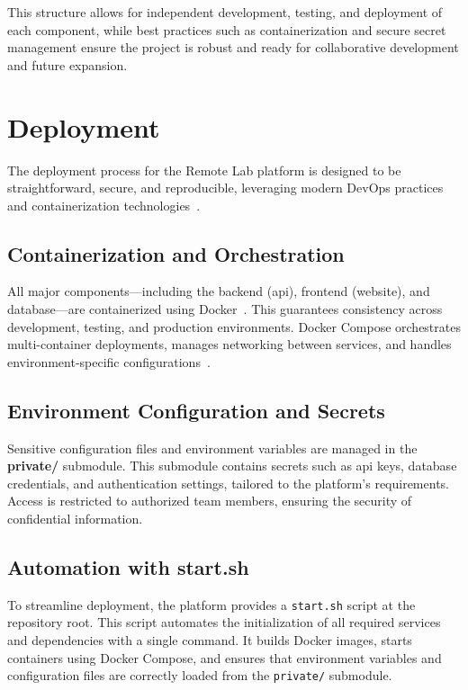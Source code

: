 This structure allows for independent development, testing, and deployment of each component, while best practices such as containerization and secure secret management ensure the project is robust and ready for collaborative development and future expansion.

\section{Deployment} \label{sec:deployment}

The deployment process for the Remote Lab platform is designed to be straightforward, secure, and reproducible, leveraging modern DevOps practices and containerization technologies~\cite{docker-docs,docker-compose-docs}.

\subsection{Containerization and Orchestration} \label{subsec:containerization}

All major components—including the backend (\ac{api}), frontend (website), and database—are containerized using Docker~\cite{docker-docs}. This guarantees consistency across development, testing, and production environments. Docker Compose orchestrates multi-container deployments, manages networking between services, and handles environment-specific configurations~\cite{docker-compose-docs}.

\subsection{Environment Configuration and Secrets} \label{subsec:env_config}

Sensitive configuration files and environment variables are managed in the \textbf{private/} submodule. This submodule contains secrets such as \ac{api} keys, database credentials, and authentication settings, tailored to the platform's requirements. Access is restricted to authorized team members, ensuring the security of confidential information.

\subsection{Automation with start.sh} \label{subsec:automation_startsh}

To streamline deployment, the platform provides a \texttt{start.sh} script at the repository root. This script automates the initialization of all required services and dependencies with a single command. It builds Docker images, starts containers using Docker Compose, and ensures that environment variables and configuration files are correctly loaded from the \texttt{private/} submodule.

